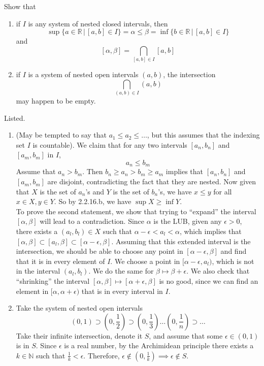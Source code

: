  \begin{exercise}[Zorich 2.3.1]
    Show that 
    \begin{enumerate}
      \item if $I$ is any system of nested closed intervals, then 
      \[\sup\{ a \in \mathbb{R}\,|\, [a, b] \in I\} = \alpha \leq \beta = \inf\{ b \in \mathbb{R}\,|\,[a, b] \in I\}\]
      and 
      \[[\alpha, \beta] = \bigcap_{[a, b] \in I} [a, b]\]
      \item if $I$ is a system of nested open intervals $(a, b)$, the intersection
      \[\bigcap_{(a, b) \in I} (a, b)\] 
      may happen to be empty. 
    \end{enumerate}
  \end{exercise}
  \begin{solution}
    Listed. 
    \begin{enumerate}
      \item (May be tempted to say that $a_1 \leq a_2 \leq \ldots$, but this assumes that the indexing set $I$ is countable). We claim that for any two intervals $[a_n, b_n]$ and $[a_m, b_m]$ in $I$, 
      \[a_n \leq b_m\]
      Assume that $a_n > b_m$. Then $b_n \geq a_n > b_m \geq a_m$ implies that $[a_n, b_n]$ and $[a_m, b_m]$ are disjoint, contradicting the fact that they are nested. Now given that $X$ is the set of $a_n$'s and $Y$ is the set of $b_n$'s, we have $x \leq y$ for all $x \in X, y \in Y$. So by 2.2.16.b, we have $\sup{X} \geq \inf{Y}$. 
      \\
      To prove the second statement, we show that trying to ``expand'' the interval $[\alpha, \beta]$ will lead to a contradiction. Since $\alpha$ is the LUB, given any $\epsilon > 0$, there exists a $(a_l, b_l) \in X$ such that $\alpha - \epsilon < a_l < \alpha$, which implies that $ [\alpha, \beta] \subset [a_l, \beta] \subset [\alpha - \epsilon, \beta]$. Assuming that this extended interval is the intersection, we should be able to choose any point in $[\alpha - \epsilon, \beta]$ and find that it is in every element of $I$. We choose a point in $[\alpha - \epsilon, a_l)$, which is not in the interval $(a_l, b_l)$. We do the same for $\beta \mapsto \beta + \epsilon$. We also check that ``shrinking'' the interval $[\alpha, \beta] \mapsto [\alpha + \epsilon, \beta]$ is no good, since we can find an element in $[\alpha, \alpha + \epsilon)$ that is in every interval in $I$. 
      
      \item Take the system of nested open intervals 
      \[(0, 1) \supset (0, \frac{1}{2}) \supset (0, \frac{1}{3}) \ldots (0, \frac{1}{n}) \supset \ldots\]
      Take their infinite intersection, denote it $S$, and assume that some $\epsilon \in (0, 1)$ is in $S$. Since $\epsilon$ is a real number, by the Archimidean principle there exists a $k \in \mathbb{N}$ such that $\frac{1}{k} < \epsilon$. Therefore, $\epsilon \not\in (0, \frac{1}{k}) \implies \epsilon \not\in S$. 
    \end{enumerate}
  \end{solution}

